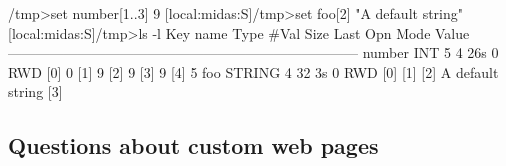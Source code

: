 \begin{DoxyEnumerate}
\begin{DoxyItemize}
\begin{DoxyCode}
                                        /tmp>set number[1..3] 9
[local:midas:S]/tmp>set foo[2] "A default string"
[local:midas:S]/tmp>ls -l
Key name                        Type    #Val  Size  Last Opn Mode Value
---------------------------------------------------------------------------
number                          INT     5     4     26s  0   RWD  
                                        [0]             0
                                        [1]             9
                                        [2]             9
                                        [3]             9
                                        [4]             5
foo                             STRING  4     32    3s   0   RWD  
                                        [0]             
                                        [1]             
                                        [2]             A default string
                                        [3]             
\end{DoxyCode}
 
\end{DoxyItemize}
\end{DoxyEnumerate}\par


\par
 \hypertarget{FAQ_FAQ_CUSTOM}{}\subsection{Questions about custom web pages}\label{FAQ_FAQ_CUSTOM}

